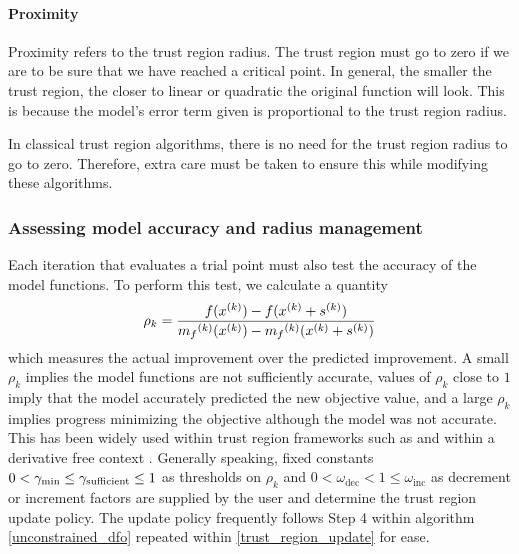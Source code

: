\paragraph{Proximity}

Proximity refers to the trust region radius.
The trust region must go to zero if we are to be sure that we have reached a critical point.
In general, the smaller the trust region, the closer to linear or quadratic the original function will look.
This is because the model's error term given is proportional to the trust region radius.

In classical trust region algorithms, there is no need for the trust region radius to go to zero.
Therefore, extra care must be taken to ensure this while modifying these algorithms.

\subsubsection{Assessing model accuracy and radius management}
Each iteration that evaluates a trial point must also test the accuracy of the model functions.
To perform this test, we calculate a quantity
\begin{equation}
\label{rho}
\rho_k = \frac{f({x}^{(k)}) - f({x}^{(k)}+{s}^{(k)})}{{{m}_f}^{(k)}({x}^{(k)}) - {{m}_f}^{(k)}({x}^{(k)}+{s}^{(k)})}
\end{equation}
which measures the actual improvement over the predicted improvement.
A small $\rho_k$ implies the model functions are not sufficiently accurate,
values of $\rho_k$ close to $1$ imply that the model accurately predicted the new objective value,
and a large $\rho_k$ implies progress minimizing the objective although the model was not accurate.
This has been widely used within trust region frameworks such as \cite{Conn:2000:TM:357813} and within a derivative free context \cite{DUMMY:intro_book}.
Generally speaking, fixed constants $0 < \gamma_{\text{min}} \le \gamma_{\text{sufficient}} \le 1$ as thresholds on $\rho_k$ and $0 < \omega_{\text{dec}} < 1 \le \omega_{\text{inc}}$ as decrement or increment factors are supplied by the user and determine the trust region update policy.
The update policy frequently follows Step 4 within algorithm \cref{unconstrained_dfo} repeated within \cref{trust_region_update} for ease.

